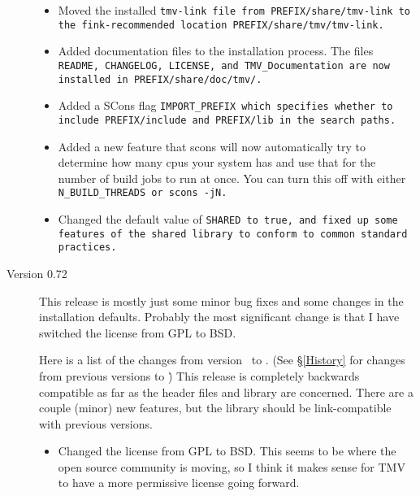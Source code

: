 \begin{description}
\begin{itemize}
\item
Moved the installed \tt{tmv-link} file from \tt{PREFIX/share/tmv-link} to the fink-recommended location \tt{PREFIX/share/tmv/tmv-link}.

\item
Added documentation files to the installation process.  The files \tt{README},
\tt{CHANGELOG}, \tt{LICENSE}, and \tt{TMV\_Documentation} are now installed in
\tt{PREFIX/share/doc/tmv/}.

\item
Added a SCons flag \tt{IMPORT\_PREFIX} which specifies whether to include
\tt{PREFIX/include} and \tt{PREFIX/lib} in the search paths.

\item
Added a new feature that scons will now automatically try to determine 
how many cpus your system has and use that for the number of build jobs 
to run at once.  You can turn this off with either \tt{N\_BUILD\_THREADS} or \tt{scons -jN}.

\item
Changed the default value of \tt{SHARED} to true, and fixed up some features of the shared
library to conform to common standard practices.

\end{itemize}

\item[Version 0.72]

This release is mostly just some minor bug fixes and some changes in the 
installation defaults.  Probably the most significant change is that I have
switched the license from GPL to BSD.  

Here is a list of the changes from version \prevtmvversion\ to \tmvversion.  
(See \S\ref{History} for changes from previous versions to \prevtmvversion\.)
This release is completely backwards compatible as far as the header files and library are 
concerned.  There are a couple (minor) new features, but the library should be link-compatible
with previous versions.

\begin{itemize}

\item Changed the license from GPL to BSD.  This seems to be where the open 
source community is moving, so I think it makes sense for TMV to have a 
more permissive license going forward.


\end{itemize}
\end{description}
